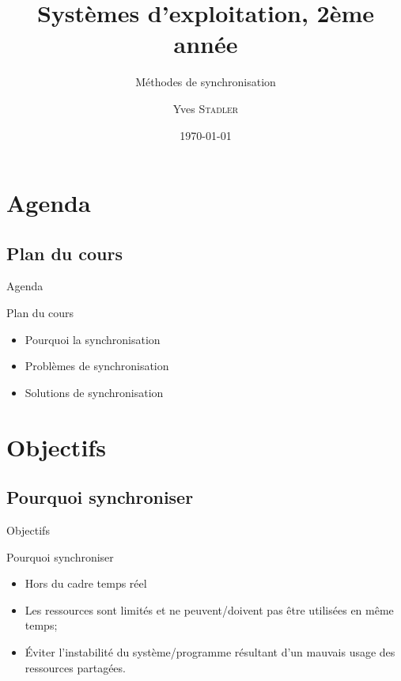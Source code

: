 
\title{Systèmes d'exploitation, 2ème année}
\subtitle{Méthodes de synchronisation}

\author{Yves \textsc{Stadler}}

\date{\today}





\begin{frame}
\titlepage
\end{frame}

\def\sectitle{Agenda}
\section{\sectitle}
\def\subsectitle{Plan du cours}
\subsection{\subsectitle}

\begin{frame}{\sectitle}
\begin{block}{\subsectitle}
\begin{itemize}
\item Pourquoi la synchronisation
\item Problèmes de synchronisation
\item Solutions de synchronisation
\end{itemize}
\end{block}
\end{frame}


\def\sectitle{Objectifs}
\section{\sectitle}
\def\subsectitle{Pourquoi synchroniser}
\subsection{\subsectitle}
\begin{frame}{\sectitle}
\begin{block}{\subsectitle}
\begin{itemize}
    \item Hors du cadre temps réel
    \item Les ressources sont limités et ne peuvent/doivent pas être utilisées 
    en même temps;
    \item Éviter l'instabilité du système/programme résultant d'un mauvais usage
    des ressources partagées.
\end{itemize}
\end{block}
\end{frame}

